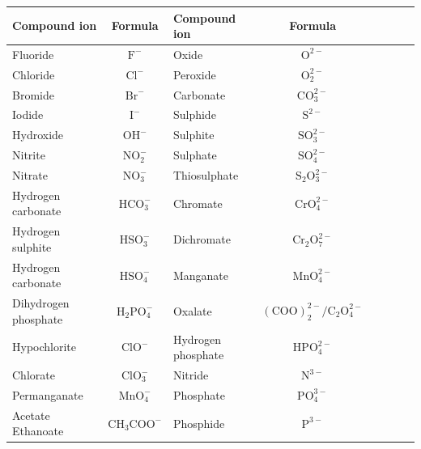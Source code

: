 \begin{enumerate}[noitemsep, label=\textbf{\arabic*}. ]
\begin{table}
\begin{center}
\label{tab:anions}
\begin{tabular}{|l|c|l|c|l|c|l|c|} \hline
\textbf{Compound ion} & \textbf{Formula}            & \textbf{Compound ion} & \textbf{Formula} \\ \hline
Fluoride             & $\mathrm{F}^{-}$             & Oxide              & $\mathrm{O}^{2-}$ \\ \hline
Chloride             & $\mathrm{Cl}^{-}$            & Peroxide           & $\mathrm{O}_{2}^{2-}$ \\ \hline
Bromide              & $\mathrm{Br}^{-}$            & Carbonate          & $\mathrm{CO}_{3}^{2-}$ \\ \hline
Iodide               & $\mathrm{I}^{-}$             & Sulphide           & $\mathrm{S}^{2-}$ \\ \hline
Hydroxide            & $\mathrm{OH}^{-}$            & Sulphite           & $\mathrm{SO}_{3}^{2-}$ \\ \hline
Nitrite              & $\mathrm{NO}_{2}^{-}$        & Sulphate           & $\mathrm{SO}_{4}^{2-}$ \\ \hline
Nitrate              & $\mathrm{NO}_{3}^{-}$        & Thiosulphate       & $\mathrm{S}_{2}{\mathrm{O}}_{3}^{2-}$ \\ \hline
Hydrogen carbonate   & $\mathrm{HCO}_{3}^{-}$       & Chromate           & $\mathrm{CrO}_{4}^{2-}$ \\ \hline
Hydrogen sulphite    & $\mathrm{HSO}_{3}^{-}$       & Dichromate         & $\mathrm{Cr}_{2}{\mathrm{O}}_{7}^{2-}$ \\ \hline
Hydrogen carbonate   & $\mathrm{HSO}_{4}^{-}$       & Manganate          & $\mathrm{MnO}_{4}^{2-}$ \\ \hline
Dihydrogen phosphate & $\mathrm{H}_{2}{\mathrm{PO}}_{4}^{-}$ & Oxalate   & $\mathrm{(COO)}_{2}^{2-}/{\mathrm{C}}_{2}{\mathrm{O}}_{4}^{2-}$ \\ \hline
Hypochlorite         & $\mathrm{ClO}^{-}$           & Hydrogen phosphate & $\mathrm{HPO}_{4}^{2-}$ \\ \hline
Chlorate             & $\mathrm{ClO}_{3}^{-}$       & Nitride            & $\mathrm{N}^{3-}$ \\ \hline
Permanganate         & $\mathrm{MnO}_{4}^{-}$       & Phosphate          & $\mathrm{PO}_{4}^{3-}$ \\ \hline
Acetate Ethanoate    & $\mathrm{CH}_{3}{\mathrm{COO}}^{-}$   & Phosphide          & $\mathrm{P}^{3-}$ \\ \hline
\end{tabular}


\end{center}
\end{table}
\end{enumerate}
